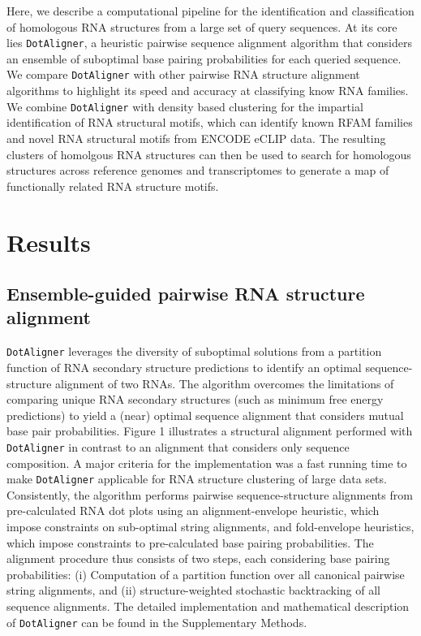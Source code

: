 \documentclass{bmcart}
\newcommand\dotaligner{\texttt{DotAligner}}
\begin{document}
Here, we describe a computational pipeline for the identification and classification of
homologous RNA structures from a large set of query sequences. At its core lies \dotaligner{}, a
heuristic pairwise sequence alignment algorithm that considers an ensemble of suboptimal 
base pairing probabilities for each queried sequence. We compare \dotaligner{} with other pairwise RNA structure alignment algorithms to highlight its speed and accuracy at classifying know RNA families. 
We combine \dotaligner{} with density based clustering for the impartial identification of 
RNA structural motifs, which can identify known RFAM families and novel RNA structural 
motifs from ENCODE eCLIP data. The resulting clusters of homolgous RNA structures can then 
be used to search for homologous structures across reference genomes and transcriptomes 
to generate a map of functionally related RNA structure motifs.  


\section*{Results}
\subsection*{Ensemble-guided pairwise RNA structure alignment} 
 
\dotaligner{} leverages the diversity of  suboptimal solutions from a partition function of RNA secondary structure predictions to identify an optimal sequence-structure alignment of two RNAs. 
The algorithm overcomes the limitations of comparing unique RNA 
secondary structures (such as minimum free energy predictions) to yield 
a (near) optimal sequence alignment that considers mutual base pair probabilities.
Figure 1 illustrates a structural alignment performed with \dotaligner{}
in contrast to an alignment that considers only sequence composition.
A major criteria for the implementation was a fast running time to make 
\dotaligner{}  applicable for RNA structure clustering of large data sets.
Consistently, the algorithm performs pairwise sequence-structure alignments from 
pre-calculated RNA dot plots using an alignment-envelope heuristic, which 
impose constraints on sub-optimal string alignments, and fold-envelope 
heuristics, which impose constraints to pre-calculated base pairing probabilities.
The alignment procedure thus consists of two steps, each considering base pairing  
probabilities: (i) Computation of a partition function over all canonical pairwise 
string alignments, and (ii) structure-weighted stochastic backtracking of 
all sequence alignments. The detailed implementation and mathematical description 
of \dotaligner{} can be found  in the Supplementary Methods.\\
\end{document}
